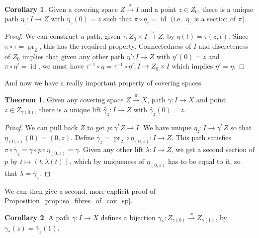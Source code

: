 \documentclass{tufte-handout}
\DeclareMathOperator{\id}{id}
\DeclareMathOperator{\pr}{pr}
\theoremstyle{definition}
\newtheorem{theorem}{Theorem}
\newtheorem{corollary}{Corollary}
\begin{document}

\begin{corollary}
Given a covering space $Z\xrightarrow{\pi}I$ and a point $z\in Z_0$, there is a unique path
$\eta_z\colon I \to Z$ with $\eta_z(0)=z$ such that $\pi\circ \eta_z = \id$ (i.e.\ $\eta_z$ is a section of $\pi$).
\end{corollary}

\begin{proof}
We can construct \emph{a} path, given $\tau\colon Z_0 \times I \xrightarrow{\simeq} Z$, by $\eta(t) = \tau(z,t)$. Since $\pi\circ\tau = \pr_2$, this has the required property.
Connectedness of $I$ and discreteness of $Z_0$ implies that given any other path $\eta'\colon I \to Z$ with $\eta'(0) = z$ and $\pi\circ \eta'=\id$, we must have $\tau^{-1}\circ \eta = \tau^{-1}\circ \eta'\colon I\to Z_0\times I$ which implies $\eta'=\eta$.
\end{proof}

And now we have a really important property of covering spaces

\begin{theorem}\label{prop:unique_path_lifting}
Given any covering space $Z\xrightarrow{\pi}X$, path $\gamma\colon I\to X$ and point $z\in Z_{\gamma(0)}$, 
there is a unique lift $\widetilde{\gamma_z}\colon I\to Z$  with $\widetilde{\gamma_z}(0)=z$.
\end{theorem}

\begin{proof}
We can pull back $Z$ to get $p\colon \gamma^*Z\to I$. We have unique $\eta_z\colon I\to \gamma^*Z$
so that $\eta_{(0,z)}(0) = (0,z)$. Define $\widetilde{\gamma_z} = \pr_2\circ \eta_{(0,z)}\colon I \to Z$.
This path satisfies $\pi\circ\widetilde{\gamma_z} = \gamma\circ p\circ\eta_{(0,z)} = \gamma$.
Given any other lift $\lambda\colon I\to Z$, we get a second section of $p$ by $t\mapsto (t,\lambda(t))$, which by uniqueness of $\eta_{(0,z)}$ has to be equal to it, so that $\lambda = \widetilde{\gamma_z}$.
\end{proof}

We can then give a second, more explicit proof of Proposition~\ref{prop:iso_fibres_of_cov_sp}.

\begin{corollary}
A path $\gamma\colon I\to X$ defines a bijection 
$\gamma_*\colon Z_{\gamma(0)} \xrightarrow{\simeq} Z_{\gamma(1)}$, by 
$\gamma_*(z) = \widetilde{\gamma_z}(1)$.
\end{corollary}
\end{document}
